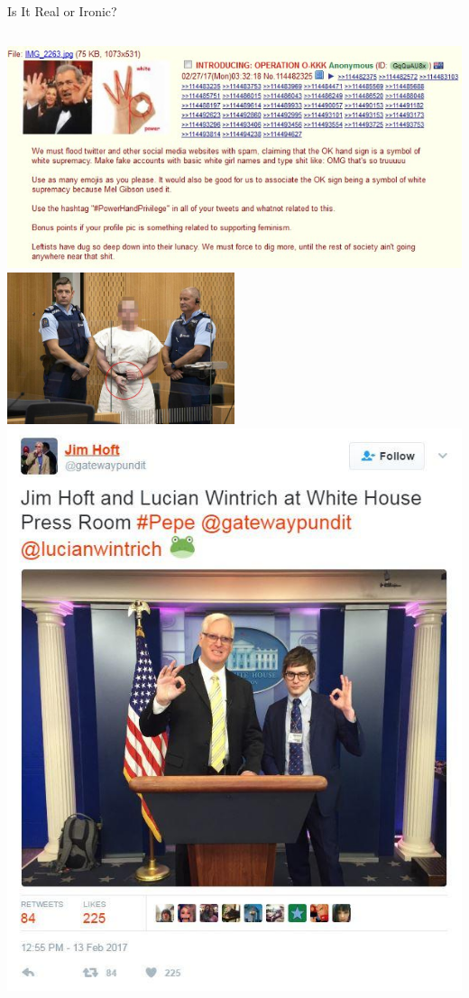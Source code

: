 \documentclass[nobackground,dvipsnames,table,aspectratio=169]{beamer}
\begin{document}
\begin{frame}{Is It Real or Ironic?}
    \begin{columns}
            \centering
            \includegraphics[width=\textwidth]{ok-symbol-4chan}
            \includegraphics[width=0.5\textwidth]{ok-symbol-brenton-tarrant}
            \includegraphics[width=\textwidth]{ok-symbol-hoft-wintrich}
    \end{columns}
\end{frame}
\end{document}
